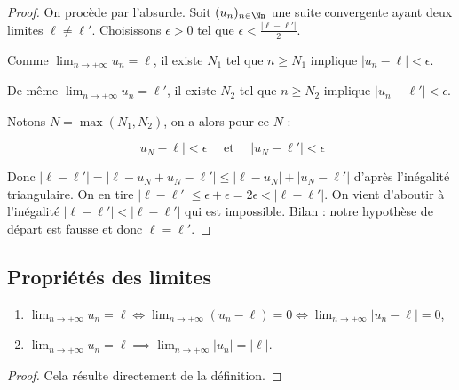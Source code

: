 \documentclass[class=report,crop=false]{standalone}
\begin{document}
\begin{proof}
  On procède par l'absurde. Soit $(u_n)_{n\in \Nn}$ une suite convergente ayant
deux limites $\ell\neq \ell'$. Choisissons $\epsilon >0$ tel que $\epsilon <\frac{\lvert \ell-\ell'\rvert}{2}$.

Comme $\lim_{n\to +\infty}u_n=\ell$, il existe $N_1$ tel que $n\geq N_1$ implique $\lvert u_n-\ell\rvert<\epsilon$.

De même $\lim_{n\to +\infty}u_n=\ell'$, il existe $N_2$ tel que $n\geq N_2$ implique $\lvert u_n-\ell'\rvert<\epsilon$.

Notons $N=\max(N_1,N_2)$, on a alors pour ce $N$ :

$$\lvert u_N-\ell\rvert<\epsilon \quad \text{ et } \quad \lvert u_N-\ell'\rvert<\epsilon$$

Donc $\lvert \ell-\ell'\rvert =\lvert \ell-u_N+u_N-\ell'\rvert\leq \lvert \ell-u_N\rvert+\lvert u_N-\ell'\rvert$
d'après l'inégalité triangulaire. On en tire
$\lvert \ell-\ell'\rvert \leq \epsilon + \epsilon =2\epsilon<\lvert \ell-\ell'\rvert$.
On vient d'aboutir à l'inégalité $\lvert \ell-\ell'\rvert < \lvert \ell-\ell'\rvert$ qui est impossible.
Bilan : notre hypothèse de départ est fausse et donc $\ell=\ell'$.
\end{proof}

\subsection{Propriétés des limites}

\begin{proposition}
\sauteligne
  \begin{enumerate}
    \item $\lim_{n\to +\infty}u_n=\ell\iff \lim_{n\to +\infty}(u_n-\ell)=0 \iff \lim_{n\to +\infty}\lvert u_n-\ell\rvert =0$,
    \item $\lim_{n\to +\infty}u_n=\ell\implies \lim_{n\to +\infty}\lvert u_n\rvert=\lvert \ell\rvert$.
  \end{enumerate}
\end{proposition}

\begin{proof}
  Cela résulte directement de la définition.
\end{proof}
\end{document}
